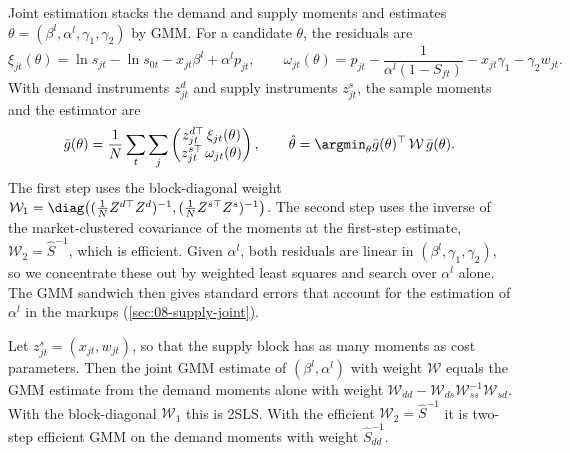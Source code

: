 Joint estimation stacks the demand and supply moments and estimates
$\theta = (\beta^l, \alpha^l, \gamma_1, \gamma_2)$ by GMM. For a candidate $\theta$, the residuals are
\begin{equation}\label{eq:C-joint-resid}
  \xi_{jt}(\theta) = \ln s_{jt} - \ln s_{0t} - x_{jt}\beta^l + \alpha^l p_{jt}, \qquad
  \omega_{jt}(\theta) = p_{jt} - \frac{1}{\alpha^l(1 - S_{ft})} - x_{jt}\gamma_1 - \gamma_2 w_{jt}.
\end{equation}
With demand instruments $z^d_{jt}$ and supply instruments $z^s_{jt}$, the sample moments and the estimator are
\begin{equation}\label{eq:C-joint}
  \bar g(\theta) = \frac{1}{N}\sum_{t}\sum_j\begin{pmatrix} z^{d\top}_{jt}\,\xi_{jt}(\theta) \\
  z^{s\top}_{jt}\,\omega_{jt}(\theta)\end{pmatrix}, \qquad
  \hat\theta = \argmin_\theta \bar g(\theta)^\top\,\mathcal W\,\bar g(\theta).
\end{equation}
The first step uses the block-diagonal weight $\mathcal W_1 = \diag\big((\frac{1}{N}Z^{d\top}Z^d)^{-1},
(\frac{1}{N}Z^{s\top}Z^s)^{-1}\big)$. The second step uses the inverse of the market-clustered covariance of the moments
at the first-step estimate, $\mathcal W_2 = \hat S^{-1}$, which is efficient. Given $\alpha^l$, both residuals are linear in
$(\beta^l, \gamma_1, \gamma_2)$, so we concentrate these out by weighted least squares and search over $\alpha^l$ alone.
The GMM sandwich then gives standard errors that account for the estimation of $\alpha^l$ in the markups
(\cref{sec:08-supply-joint}).

\begin{proposition}\label{prop:C-redundant}
Let $z^s_{jt} = (x_{jt}, w_{jt})$, so that the supply block has as many moments as cost parameters. Then the joint GMM
estimate of $(\beta^l, \alpha^l)$ with weight $\mathcal W$ equals the GMM estimate from the demand moments alone with weight
$\mathcal W_{dd} - \mathcal W_{ds}\mathcal W_{ss}^{-1}\mathcal W_{sd}$. With the block-diagonal $\mathcal W_1$ this is 2SLS. With
the efficient $\mathcal W_2 = \hat S^{-1}$ it is two-step efficient GMM on the demand moments with weight $\hat S_{dd}^{-1}$.
\end{proposition}

